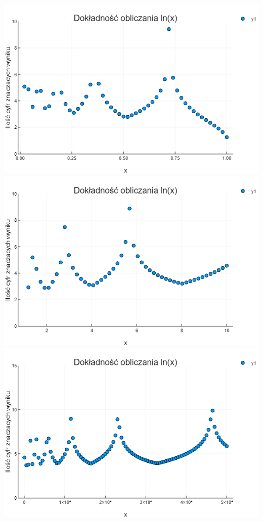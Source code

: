 \documentclass[10pt]{article}
\begin{document}
\includegraphics[scale=0.60]{wykres2.png}
\includegraphics[scale=0.60]{wykres3.png}
\includegraphics[scale=0.60]{wykres4.png}
\end{document}
